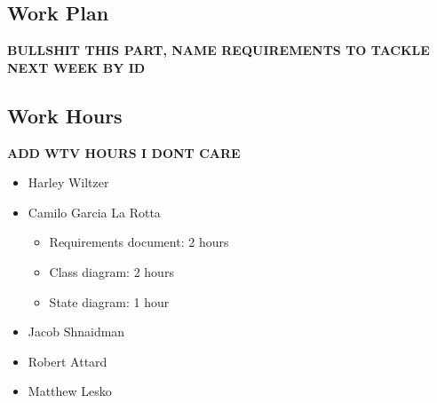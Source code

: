 \documentclass[12pt]{article}
\begin{document}
\subsection{Work Plan}

\textbf{BULLSHIT THIS PART, NAME REQUIREMENTS TO TACKLE NEXT WEEK BY ID}

\subsection{Work Hours}
\textbf{ADD WTV HOURS I DONT CARE}
\begin{itemize}
    \item Harley Wiltzer
    \item Camilo Garcia La Rotta
    \begin{itemize}
        \item Requirements document: 2 hours
        \item Class diagram: 2 hours
        \item State diagram: 1 hour
    \end{itemize}
    \item Jacob Shnaidman
    \item Robert Attard
    \item Matthew Lesko
\end{itemize}
\end{document}
